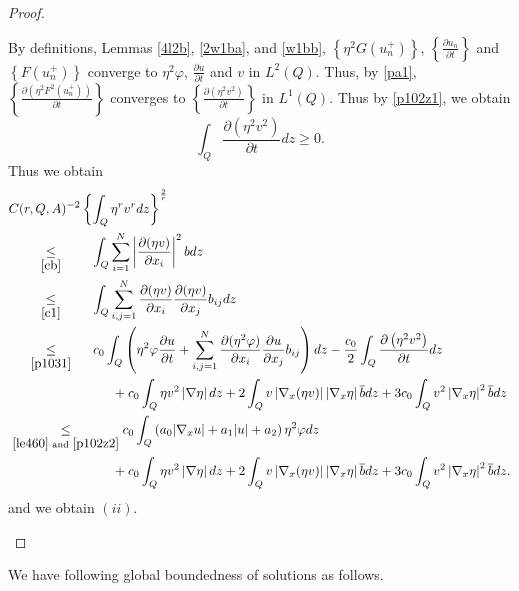 \documentclass[11pt, a4paper]{article}
\numberwithin{equation}{section}
\newcommand{\coex}[2][\hphantom{longexplanation}]{%
  \underset{{#1}}{\overset{\hphantom{longexplanation}}{#2}}
}
\newcommand{\abs}[1]{\left\lvert #1\right\rvert}
\begin{document}
\begin{proof}
\begin{itemize}[wide]
By definitions, Lemmas \ref{4l2b}, \ref{2w1ba}, and \ref{w1bb}, $\left\{\eta^{2}G(u_{n}^{+})\right\}$, $\displaystyle\left\{\frac{\partial u_{n}}{\partial t}\right\}$ and $\left\{ F(u_{n}^{+})\right\}$ converge to $\eta^{2}\varphi$, $\displaystyle \frac{\partial u}{\partial t}$ and $ v$ in $L^{2}(Q)$. Thus, by \eqref{pa1}, $\displaystyle \left\{\frac{\partial(\eta^{2}F^{2}(u_{n}^{+}))}{\partial t}\right\}$ converges to $\displaystyle \left\{\frac{\partial(\eta^{2}v^{2})}{\partial t}\right\}$ in $L^{1}(Q)$. Thus by \eqref{p102z1}, we obtain
 \begin{equation}
\int_{Q}\frac{\partial (\eta^{2}v^{2})}{\partial t}dz\ge 0.
 \label{p102z2}
 \end{equation}
 Thus we obtain 
 \begin{align*}
   &C(r,Q,A)^{-2}\left\{\int_{Q}\eta^{r}v^{r}dz\right\}^{\frac{2}{r}}\\
   &\coex[\eqref{cb}]{\le}
     \int_{Q}\sum_{i=1}^{N}\abs{\frac{\partial (\eta v)}{\partial
     x_{i}}}^{2}bdz\\
   &\coex[\eqref{c1}]{\le}
     \int_{Q}\sum_{i,j=1}^{N}\frac{\partial (\eta v)}{\partial
     x_{i}}\frac{\partial(\eta v)}{\partial x_{j}}b_{ij}dz\\
   &\coex[\eqref{p1031}]{\le}
     c_{0}\int_{Q} \left( \eta^{2}\varphi\frac{\partial u}{\partial t}
     +\sum_{i,j=1}^{N}\frac{\partial (\eta^{2}\varphi)}{\partial
     x_{i}}\frac{\partial u}{\partial x_{j}}b_{ij} \right)dz -\frac{c_{0}}{2}
     \int_{Q}\frac{\partial \left(\eta^{2}v^{2} \right)}{\partial t}dz\\
   &\coex{~} \qquad + c_{0}\int_{Q}\eta v^{2}\abs{\nabla \eta} dz
     +2\int_{Q}v \abs{\nabla_{x}(\eta v)} \abs{\nabla_x \eta}\overline{b}dz
     +3c_{0}\int_{Q}v^{2}\abs{\nabla_x \eta}^{2}\overline{b}dz\\
   &\coex[\eqref{le460} \text{ and }\eqref{p102z2}]{\le}
     c_{0}\int_{Q} \left( a_{0}|\nabla_{x} u|+a_{1}|u|
     +a_{2} \right)\eta^{2}\varphi dz\\
    &\coex{~} \qquad + c_{0}\int_{Q}\eta v^{2}\abs{\nabla \eta} dz
     +2\int_{Q}v \abs{\nabla_{x}(\eta v)} \abs{\nabla_x \eta}\overline{b}dz
     +3c_{0}\int_{Q}v^{2}\abs{\nabla_x \eta}^{2}\overline{b}dz.
 \end{align*}
and we obtain $(ii)$.
\end{itemize}
\end{proof}
 We have following global boundedness of solutions  as follows. 
\end{document}
